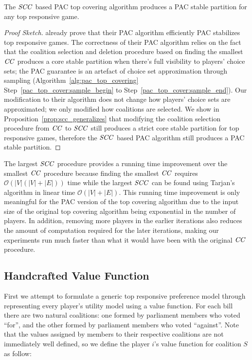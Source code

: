 \begin{theorem}
  The $\mathit{SCC}$ based PAC top covering algorithm produces a PAC stable partition
  for any top responsive game.
\end{theorem}

\begin{proof}[Proof Sketch]
 already prove that their PAC algorithm efficiently PAC
stabilizes top responsive games.
The correctness of their PAC algorithm relies on the fact that the coalition
selection and deletion procedure based on finding the smallest $\mathit{CC}$ produces
a core stable partition when there's full visibility to players' choice sets;
the PAC guarantee is an artefact of choice set approximation through sampling
(Algorithm~\ref{alg:pac_top_covering} Step~\ref{pac_top_cover:sample_begin} to
Step~\ref{pac_top_cover:sample_end}).
Our modification to their algorithm does not change how players' choice sets
are approximated; we only modified how coalitions are selected.
We show in Proposition~\ref{prop:scc_generalizes} that modifying the coalition
selection procedure from $\mathit{CC}$ to $\mathit{SCC}$ still produces a strict core stable
partition for top responsive games, therefore the $\mathit{SCC}$ based PAC algorithm
still produces a PAC stable partition.
\end{proof}

The largest $\mathit{SCC}$ procedure provides a running time improvement over the
smallest $\mathit{CC}$ procedure because finding the smallest $\mathit{CC}$ requires
$\mathcal{O}(|V|(|V| + |E|))$ time while the largest $\mathit{SCC}$ can be found using
Tarjan's algorithm in linear time $\mathcal{O}(|V| + |E|)$\cite{Tarjan72depthfirst}.
This running time improvement is only meaningful for the PAC version of the
top covering algorithm due to the input size of the original top covering
algorithm being exponential in the number of players.
In addition, removing more players in the earlier iterations also reduces
the amount of computation required for the later iterations, making our
experiments run much faster than what it would have been with the original
$\mathit{CC}$ procedure.


\subsection{Handcrafted Value Function}
\label{subsec:handcrafted_value_function}

First we attempt to formulate a generic top responsive preference model
through representing every player's utility model using a value function.
For each bill there are two natural coalitions:
one formed by parliament members who voted ``for'',
and the other formed by parliament members who voted ``against''.
Note that the values assigned by members to their respective coalitions
are not immediately well defined,
so we define the player $i$'s value function for coalition $S$ as follow:

